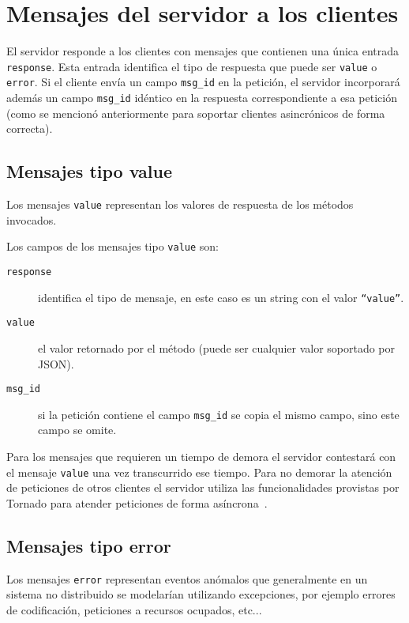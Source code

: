 \section{Mensajes del servidor a los clientes}

El servidor responde a los clientes con mensajes que contienen una única
entrada \texttt{response}. Esta entrada identifica el tipo de respuesta
que puede ser \texttt{value} o \texttt{error}. Si el cliente envía un
campo \texttt{msg\_id} en la petición, el servidor incorporará además
un campo \texttt{msg\_id} idéntico en la respuesta correspondiente
a esa petición (como se mencionó anteriormente para soportar
clientes asincrónicos de forma correcta).

\subsection{Mensajes tipo value}

Los mensajes \texttt{value} representan los valores de respuesta de
los métodos invocados.

Los campos de los mensajes tipo \texttt{value} son:

\begin{description}
    \item[\texttt{response}] identifica el tipo de mensaje, en este caso
        es un string con el valor \texttt{``value''}.
    \item[\texttt{value}] el valor retornado por el método (puede ser
        cualquier valor soportado por JSON).
    \item[\texttt{msg\_id}] si la petición contiene el campo \texttt{msg\_id} se
        copia el mismo campo, sino este campo se omite.
\end{description}

Para los mensajes que requieren
un tiempo de demora el servidor contestará con el mensaje \texttt{value}
una vez transcurrido ese tiempo. Para no demorar la atención de peticiones
de otros clientes el servidor utiliza las funcionalidades provistas por
Tornado para atender peticiones de forma asíncrona~\citep{dory_2012}.

\subsection{Mensajes tipo error}

Los mensajes \texttt{error} representan eventos anómalos que
generalmente en un sistema no distribuido se modelarían utilizando
excepciones, por ejemplo errores de codificación, peticiones a recursos
ocupados, etc...

